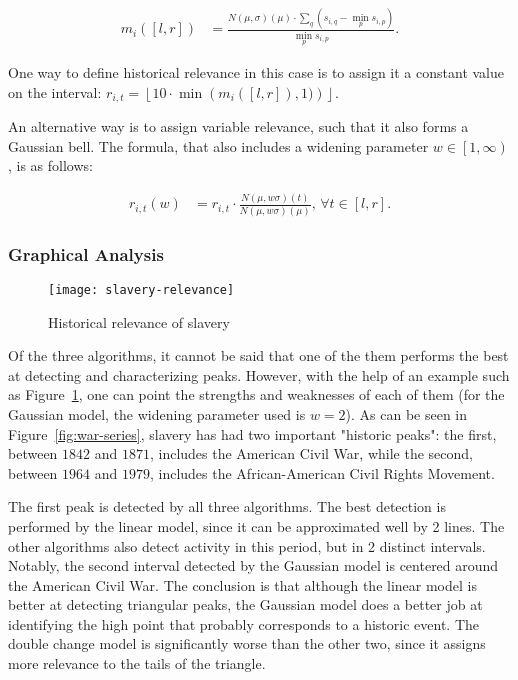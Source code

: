 \begin{align}
\label{eq:gaussian-magnitude}
m_i \left( \left[ l, r \right] \right) &= \frac{N \left( \mu, \sigma \right) \left( \mu \right) \cdot \sum_{q} \left( s_{i, q} - \min_{p} s_{i, p} \right)}{\min_{p} s_{i, p}}.
\end{align}

One way to define historical relevance in this case is to assign it a constant value on the interval: $r_{i, t} = \left\lfloor 10 \cdot \min \left( m_i \left( \left[ l, r \right] \right), 1) \right) \right\rfloor$.

An alternative way is to assign variable relevance, such that it also forms a Gaussian bell. The formula, that also includes a widening parameter $w \in \left[ 1, \infty \right)$, is as follows:

\begin{align}
\label{eq:gaussian-model-variable-relevance}
r_{i, t} \left( w \right) &= r_{i, t} \cdot \frac{N \left( \mu, w \sigma \right) \left( t \right)}{N \left( \mu, w \sigma \right) \left( \mu \right)}, \, \forall t \in \left[ l, r \right].
\end{align}

\subsubsection{Graphical Analysis}

\begin{figure}[t]
\centering
\texttt{[image: slavery-relevance]}
\caption{Historical relevance of slavery}
\label{fig:slavery-relevance}
\end{figure}

Of the three algorithms, it cannot be said that one of the them performs the best at detecting and characterizing peaks. However, with the help of an example such as Figure~\ref{fig:slavery-relevance}, one can point the strengths and weaknesses of each of them (for the Gaussian model, the widening parameter used is $w = 2$). As can be seen in Figure~\ref{fig:war-series}, slavery has had two important "historic peaks": the first, between $1842$ and $1871$, includes the American Civil War, while the second, between $1964$ and $1979$, includes the African-American Civil Rights Movement.

The first peak is detected by all three algorithms. The best detection is performed by the linear model, since it can be approximated well by 2 lines. The other algorithms also detect activity in this period, but in 2 distinct intervals. Notably, the second interval detected by the Gaussian model is centered around the American Civil War. The conclusion is that although the linear model is better at detecting triangular peaks, the Gaussian model does a better job at identifying the high point that probably corresponds to a historic event. The double change model is significantly worse than the other two, since it assigns more relevance to the tails of the triangle.

